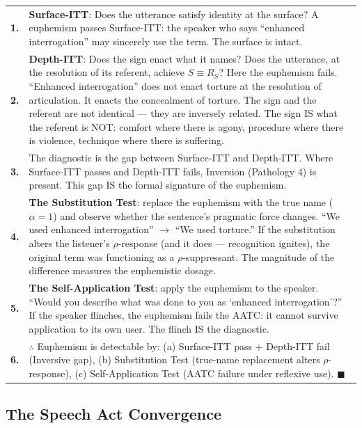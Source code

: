 \documentclass[11pt, oneside]{article}
\theoremstyle{definition}
\begin{document}
{\small
\noindent\begin{tabular}{r p{}}
\textbf{1.} & \textbf{Surface-ITT}: Does the utterance satisfy identity at the surface? A euphemism passes Surface-ITT: the speaker who says ``enhanced interrogation'' may sincerely use the term. The surface is intact. \\[0.3em]
\textbf{2.} & \textbf{Depth-ITT}: Does the sign enact what it names? Does the utterance, at the resolution of its referent, achieve $S \equiv R_S$? Here the euphemism fails. ``Enhanced interrogation'' does not enact torture at the resolution of articulation. It enacts the concealment of torture. The sign and the referent are not identical --- they are inversely related. The sign IS what the referent is NOT: comfort where there is agony, procedure where there is violence, technique where there is suffering. \\[0.3em]
\textbf{3.} & The diagnostic is the gap between Surface-ITT and Depth-ITT. Where Surface-ITT passes and Depth-ITT fails, Inversion (Pathology 4) is present. This gap IS the formal signature of the euphemism. \\[0.3em]
\textbf{4.} & \textbf{The Substitution Test}: replace the euphemism with the true name ($\alpha = 1$) and observe whether the sentence's pragmatic force changes. ``We used enhanced interrogation'' $\to$ ``We used torture.'' If the substitution alters the listener's $\rho$-response (and it does --- recognition ignites), the original term was functioning as a $\rho$-suppressant. The magnitude of the difference measures the euphemistic dosage. \\[0.3em]
\textbf{5.} & \textbf{The Self-Application Test}: apply the euphemism to the speaker. ``Would you describe what was done to you as `enhanced interrogation'?'' If the speaker flinches, the euphemism fails the AATC: it cannot survive application to its own user. The flinch IS the diagnostic. \\[0.3em]
\textbf{6.} & $\therefore$ Euphemism is detectable by: (a) Surface-ITT pass + Depth-ITT fail (Inversive gap), (b) Substitution Test (true-name replacement alters $\rho$-response), (c) Self-Application Test (AATC failure under reflexive use). \hfill $\blacksquare$ \\[0.3em]
\end{tabular}
}

\subsection{The Speech Act Convergence}
\end{document}
